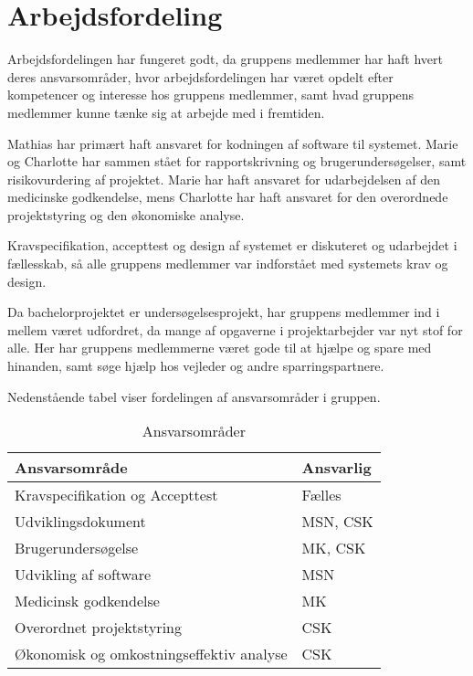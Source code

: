 \section{Arbejdsfordeling}
Arbejdsfordelingen har fungeret godt, da gruppens medlemmer har haft hvert deres ansvarsområder, hvor arbejdsfordelingen har været opdelt efter kompetencer og interesse hos gruppens medlemmer, samt hvad gruppens medlemmer kunne tænke sig at arbejde med i fremtiden.  

Mathias har primært haft ansvaret for kodningen af software til systemet. Marie og Charlotte har sammen stået for rapportskrivning og brugerundersøgelser, samt risikovurdering af projektet. Marie har haft ansvaret for udarbejdelsen af den medicinske godkendelse, mens Charlotte har haft ansvaret for den overordnede projektstyring og den økonomiske analyse. 

Kravspecifikation, accepttest og design af systemet er diskuteret og udarbejdet i fællesskab, så alle gruppens medlemmer var indforstået med systemets krav og design. 

Da bachelorprojektet er undersøgelsesprojekt, har gruppens medlemmer ind i mellem været udfordret, da mange af opgaverne i projektarbejder var nyt stof for alle. Her har gruppens medlemmerne været gode til at hjælpe og spare med hinanden, samt søge hjælp hos vejleder og andre sparringspartnere.  

Nedenstående tabel viser fordelingen af ansvarsområder i gruppen. 

\begin{table}[h]
\centering
\begin{tabular}{|l| p{}|}
\hline
\textbf{Ansvarsområde} &  \textbf{Ansvarlig} \\\hline
Kravspecifikation og Accepttest & Fælles \\\hline
Udviklingsdokument & MSN, CSK\\\hline
Brugerundersøgelse & MK, CSK \\\hline
Udvikling af software & MSN\\\hline
Medicinsk godkendelse & MK \\\hline
Overordnet projektstyring & CSK \\\hline
Økonomisk og omkostningseffektiv analyse & CSK \\\hline
\end{tabular}
\caption{Ansvarsområder}
\end{table}

